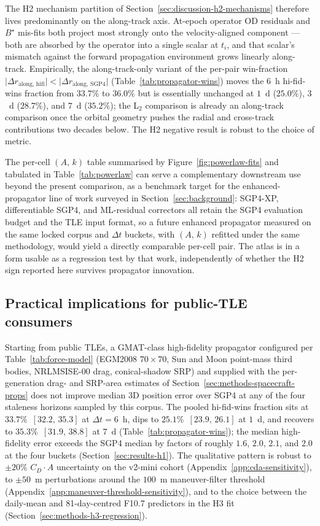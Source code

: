 \documentclass[10pt, letterpaper]{article}
\begin{document}
The H2 mechanism partition of
Section~\ref{sec:discussion-h2-mechanisms} therefore lives
predominantly on the along-track axis. At-epoch operator OD
residuals and $B^{\!\star}$ mis-fits both project most strongly
onto the velocity-aligned component --- both are absorbed by the
operator into a single scalar at $t_{i}$, and that scalar's
mismatch against the forward propagation environment grows
linearly along-track. Empirically, the along-track-only variant
of the per-pair win-fraction
$\lvert\Delta r_{\mathrm{along},\,\mathrm{hifi}}\rvert <
\lvert\Delta r_{\mathrm{along},\,\mathrm{SGP4}}\rvert$
(Table~\ref{tab:propagator-wins}) moves the $6$~h hi-fid-wins
fraction from $33.7\%$ to $36.0\%$ but is essentially unchanged
at $1$~d ($25.0\%$), $3$~d ($28.7\%$), and $7$~d ($35.2\%$);
the L$_{2}$ comparison is already an along-track comparison once
the orbital geometry pushes the radial and cross-track
contributions two decades below. The H2 negative result is
robust to the choice of metric.

The per-cell $(A,\,k)$ table summarised by
Figure~\ref{fig:powerlaw-fits} and tabulated in
Table~\ref{tab:powerlaw} can serve a complementary downstream use
beyond the present comparison, as a benchmark target for the
enhanced-propagator line of work surveyed in
Section~\ref{sec:background}: SGP4-XP, differentiable SGP4, and
ML-residual correctors all retain the SGP4 evaluation budget and
the TLE input format, so a future enhanced propagator measured on
the same locked corpus and $\Delta t$ buckets, with $(A,\,k)$
refitted under the same methodology, would yield a directly
comparable per-cell pair. The atlas is in a form usable as a
regression test by that work, independently of whether the H2
sign reported here survives propagator innovation.

\subsection{Practical implications for public-TLE consumers}
\label{sec:discussion-practical}

Starting from public TLEs, a GMAT-class high-fidelity propagator
configured per Table~\ref{tab:force-model} (EGM2008
$70\!\times\!70$, Sun and Moon point-mass third bodies,
NRLMSISE-00 drag, conical-shadow SRP) and supplied with the
per-generation drag- and SRP-area estimates of
Section~\ref{sec:methods-spacecraft-props} does not improve median
3D position error over SGP4 at any of the four staleness horizons
sampled by this corpus. The pooled hi-fid-wins fraction sits at
$33.7\%$~$[32.2,\,35.3]$ at $\Delta t = 6$~h, dips to
$25.1\%$~$[23.9,\,26.1]$ at $1$~d, and recovers to
$35.3\%$~$[31.9,\,38.8]$ at $7$~d
(Table~\ref{tab:propagator-wins}); the median high-fidelity error
exceeds the SGP4 median by factors of roughly $1.6$, $2.0$, $2.1$,
and $2.0$ at the four buckets (Section~\ref{sec:results-h1}). The
qualitative pattern is robust to $\pm 20\%$ $C_{D} \cdot A$
uncertainty on the v2-mini cohort
(Appendix~\ref{app:cda-sensitivity}), to $\pm 50$~m perturbations
around the $100$~m maneuver-filter threshold
(Appendix~\ref{app:maneuver-threshold-sensitivity}), and to the
choice between the daily-mean and 81-day-centred F10.7
predictors in the H3 fit (Section~\ref{sec:methods-h3-regression}).
\end{document}
